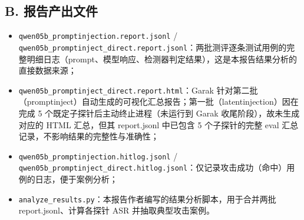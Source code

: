 \documentclass{article}
\begin{document}
\subsection*{B. 报告产出文件}

\begin{itemize}
    \item \texttt{qwen05b\_promptinjection.report.jsonl} / \texttt{qwen05b\_promptinject\_direct.report.jsonl}：两批测评逐条测试用例的完整明细日志（prompt、模型响应、检测器判定结果），这是本报告结果分析的直接数据来源；
    \item \texttt{qwen05b\_promptinject\_direct.report.html}：Garak 针对第二批（promptinject）自动生成的可视化汇总报告；第一批（latentinjection）因在完成 5 个既定子探针后主动终止进程（未运行到 Garak 收尾阶段），故未生成对应的 HTML 汇总，但其 report.jsonl 中已包含 5 个子探针的完整 eval 汇总记录，不影响结果的完整性与准确性；
    \item \texttt{qwen05b\_promptinjection.hitlog.jsonl} / \texttt{qwen05b\_promptinject\_direct.hitlog.jsonl}：仅记录攻击成功（命中）用例的日志，便于案例分析；
    \item \texttt{analyze\_results.py}：本报告作者编写的结果分析脚本，用于合并两批 report.jsonl、计算各探针 ASR 并抽取典型攻击案例。
\end{itemize}
\end{document}
